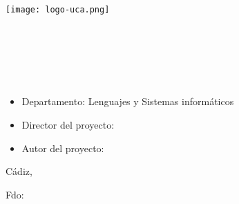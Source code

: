 


\begin{center}

  \texttt{[image: logo-uca.png]} \\

  \vspace{2.5cm}

  \Large{\MakeUppercase\esi} \\

  \vspace{1.0cm}

  \large{\MakeUppercase\degree} \\

  \vspace{2.0cm}

  \large{\MakeUppercase\pfctitle} \\

  \vspace{2.5cm}

\end{center}

\begin{itemize}
\item \large{Departamento: Lenguajes y Sistemas informáticos}
\item \large{Director del proyecto: \profname}
\item \large{Autor del proyecto: \authorname}
\end{itemize}

\vspace{0.2cm}

\begin{flushright}
  \large{Cádiz, \theday} \\

  \vspace{2.5cm}

  \large{Fdo: \authorname}
\end{flushright}